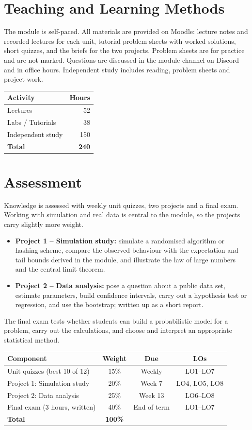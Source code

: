 \documentclass[11pt,a4paper]{article}
\begin{document}
\section{Teaching and Learning Methods}
The module is self-paced. All materials are provided on Moodle: lecture notes and
recorded lectures for each unit, tutorial problem sheets with worked solutions,
short quizzes, and the briefs for the two projects. Problem sheets are for practice
and are not marked. Questions are discussed in the module channel on Discord and in
office hours. Independent study includes reading, problem sheets and project work.

\begin{tabularx}{0.6\textwidth}{X r}
\toprule
\textbf{Activity} & \textbf{Hours} \\
\midrule
Lectures            & 52 \\
Labs / Tutorials    & 38 \\
Independent study   & 150 \\
\midrule
\textbf{Total}      & \textbf{240} \\
\bottomrule
\end{tabularx}

\section{Assessment}
Knowledge is assessed with weekly unit quizzes, two projects and a final
exam. Working with simulation and real data is central to the module, so the
projects carry slightly more weight.
\begin{itemize}
  \item \textbf{Project 1 -- Simulation study:} simulate a randomised algorithm or
        hashing scheme, compare the observed behaviour with the expectation and tail
        bounds derived in the module, and illustrate the law of large numbers and
        the central limit theorem.
  \item \textbf{Project 2 -- Data analysis:} pose a question about a public data
        set, estimate parameters, build confidence intervals, carry out a hypothesis
        test or regression, and use the bootstrap; written up as a short report.
\end{itemize}
The final exam tests whether students can build a probabilistic model for a
problem, carry out the calculations, and choose and interpret an appropriate
statistical method.

\begin{tabularx}{\textwidth}{X c c c}
\toprule
\textbf{Component} & \textbf{Weight} & \textbf{Due} & \textbf{LOs} \\
\midrule
Unit quizzes (best 10 of 12) & 15\% & Weekly & LO1--LO7 \\
Project 1: Simulation study & 20\% & Week 7 & LO4, LO5, LO8 \\
Project 2: Data analysis & 25\% & Week 13 & LO6--LO8 \\
Final exam (3 hours, written) & 40\% & End of term & LO1--LO7 \\
\midrule
\textbf{Total}      & \textbf{100\%} & & \\
\bottomrule
\end{tabularx}
\end{document}
